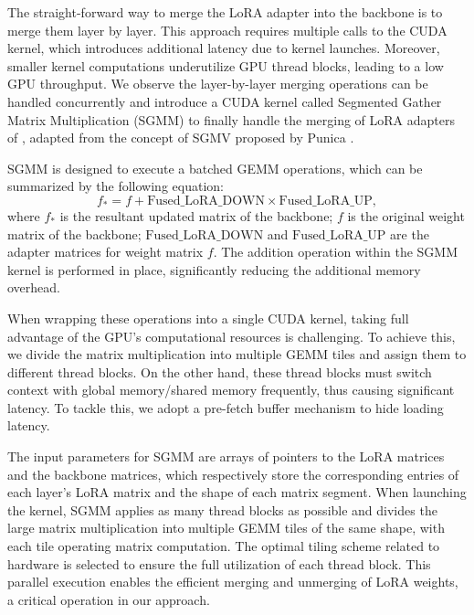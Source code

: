 The straight-forward way to merge the LoRA adapter into the backbone is to merge them layer by layer. This approach requires multiple calls to the CUDA kernel, which introduces additional latency due to kernel launches. Moreover, smaller kernel computations underutilize GPU thread blocks, leading to a low GPU throughput. We observe the layer-by-layer merging operations can be handled concurrently and introduce a CUDA kernel called Segmented Gather Matrix Multiplication (SGMM) to finally handle the merging of LoRA adapters of \sys, adapted from the concept of SGMV proposed by Punica \cite{chen2023punica}.

SGMM is designed to execute a batched GEMM operations, which can be summarized by the following equation:
\begin{equation}\label{equation:sgmm}
    f_* =  f +  \text{Fused\_LoRA\_DOWN} \times \text{Fused\_LoRA\_UP},
\end{equation}
where $f_*$ is the resultant updated matrix of the backbone; $f$ is the original weight matrix of the backbone; $\text{Fused\_LoRA\_DOWN}$ and $\text{Fused\_LoRA\_UP}$ are the adapter matrices for weight matrix $f$. The addition operation within the SGMM kernel is performed in place, significantly reducing the additional memory overhead.

When wrapping these operations into a single CUDA kernel, taking full advantage of the GPU's computational resources is challenging. To achieve this, we divide the matrix multiplication into multiple GEMM tiles and assign them to different thread blocks. On the other hand, these thread blocks must switch context with global memory/shared memory frequently, thus causing significant latency. To tackle this, we adopt a pre-fetch buffer mechanism to hide loading latency.

The input parameters for SGMM are arrays of pointers to the LoRA matrices and the backbone matrices, which respectively store the corresponding entries of each layer's LoRA matrix and the shape of each matrix segment. When launching the kernel, SGMM applies as many thread blocks as possible and divides the large matrix multiplication into multiple GEMM tiles of the same shape, with each tile operating matrix computation. The optimal tiling scheme related to hardware is selected to ensure the full utilization of each thread block. This parallel execution enables the efficient merging and unmerging of LoRA weights, a critical operation in our approach.

